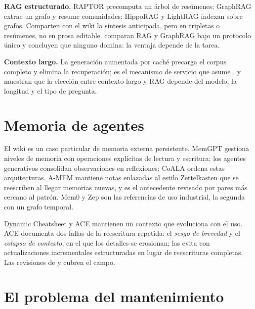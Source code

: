 \documentclass[11pt,letterpaper]{article}
\begin{document}
\textbf{RAG estructurado.} RAPTOR \citep{sarthi2024} precomputa un árbol de resúmenes; GraphRAG \citep{edge2024} extrae un grafo y resume comunidades; HippoRAG \citep{gutierrez2024,gutierrez2025} y LightRAG \citep{guo2024} indexan sobre grafos. Comparten con el wiki la síntesis anticipada, pero en tripletas o resúmenes, no en prosa editable. \citet{han2025} comparan RAG y GraphRAG bajo un protocolo único y concluyen que ninguno domina: la ventaja depende de la tarea.

\textbf{Contexto largo.} La generación aumentada por caché \citep{chan2024} precarga el corpus completo y elimina la recuperación; es el mecanismo de servicio que asume \citet{huerta2026wicer}. \citet{li2024} y \citet{li2025lara} muestran que la elección entre contexto largo y RAG depende del modelo, la longitud y el tipo de pregunta.

\section{Memoria de agentes}

El wiki es un caso particular de memoria externa persistente. MemGPT \citep{packer2023} gestiona niveles de memoria con operaciones explícitas de lectura y escritura; los agentes generativos \citep{park2023} consolidan observaciones en reflexiones; CoALA \citep{sumers2023} ordena estas arquitecturas. A-MEM \citep{xu2025amem} mantiene notas enlazadas al estilo Zettelkasten que se reescriben al llegar memorias nuevas, y es el antecedente revisado por pares más cercano al patrón. Mem0 \citep{chhikara2025} y Zep \citep{rasmussen2025} son las referencias de uso industrial, la segunda con un grafo temporal.

Dynamic Cheatsheet \citep{suzgun2025} y ACE \citep{zhang2025ace} mantienen un contexto que evoluciona con el uso. ACE documenta dos fallas de la reescritura repetida: el \emph{sesgo de brevedad} y el \emph{colapso de contexto}, en el que los detalles se erosionan; las evita con actualizaciones incrementales estructuradas en lugar de reescrituras completas. Las revisiones de \citet{hu2025} y \citet{huang2026survey} cubren el campo.

\section{El problema del mantenimiento}
\end{document}
